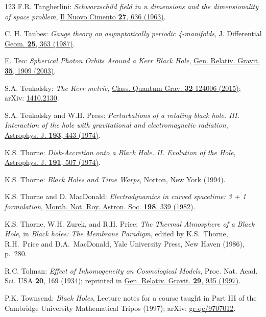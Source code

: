 \begin{thebibliography}{123}
F.R. Tangherlini:
{\em Schwarzschild field in n dimensions and the dimensionality of space problem},
\href{https://doi.org/10.1007/BF02784569}{Il Nuovo Cimento {\bf 27}, 636 (1963)}.

C. H. Taubes:
{\em Gauge theory on asymptotically periodic 4-manifolds},
\href{https://doi.org/10.4310/jdg/1214440981}{J. Differential Geom. {\bf 25}, 363 (1987)}.

E. Teo:
{\em Spherical Photon Orbits Around a Kerr Black Hole},
\href{https://doi.org/10.1023/A:1026286607562}{Gen. Relativ. Gravit. {\bf 35}, 1909 (2003)}.

S.A. Teukolsky:
{\em The Kerr metric},
\href{https://doi.org/10.1088/0264-9381/32/12/124006}{Class. Quantum Grav. {\bf 32} 124006 (2015)};
arXiv: \href{https://arxiv.org/abs/1410.2130}{1410.2130}.

S.A. Teukolsky and W.H. Press:
{\em Perturbations of a rotating black hole. III. Interaction of the hole with gravitational and electromagnetic radiation},
\href{https://doi.org/10.1086/153180}{Astrophys. J. {\bf 193}, 443 (1974)}.

K.S. Thorne:
{\em Disk-Accretion onto a Black Hole. II. Evolution of the Hole},
\href{https://doi.org/10.1086/152991}{Astrophys. J. {\bf 191}, 507 (1974)}.

K.S. Thorne:
{\em Black Holes and Time Warps},
Norton, New York (1994).

K.S. Thorne and D. MacDonald:
{\em Electrodynamics in curved spacetime: 3 + 1 formulation},
\href{https://doi.org/10.1093/mnras/198.2.339}{Month. Not. Roy. Astron. Soc. {\bf 198}, 339 (1982)}.

K.S. Thorne, W.H. Zurek, and R.H. Price:
{\em The Thermal Atmosphere of a Black Hole},
in {\em Black holes: The Membrane Paradigm},
edited by  K.S.~Thorne, R.H.~Price and D.A.~MacDonald,
Yale University Press, New Haven (1986), p.~280.

R.C. Tolman:
{\em Effect of Inhomogeneity on Cosmological Models},
Proc. Nat. Acad. Sci. USA {\bf 20}, 169 (1934);
reprinted in \href{https://doi.org/10.1023/A:1018891418565}{Gen. Relativ. Gravit. {\bf 29}, 935 (1997)}.

P.K. Townsend: {\em Black Holes}, Lecture notes for a course taught in Part III
of the Cambridge University Mathematical Tripos (1997);
arXiv: \href{https://arxiv.org/abs/gr-qc/9707012}{gr-qc/9707012}.


\end{thebibliography}
